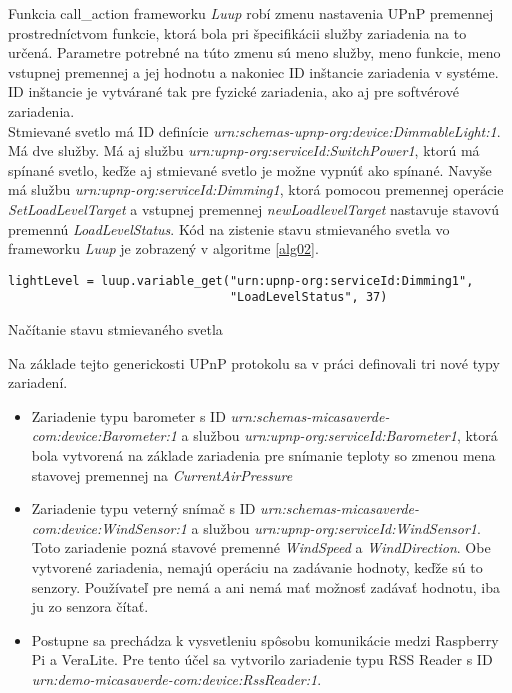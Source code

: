 Funkcia call\_action frameworku \textit{Luup} robí zmenu nastavenia UPnP premennej prostredníctvom funkcie, ktorá bola pri špecifikácii služby zariadenia na to určená. Parametre potrebné na túto zmenu sú meno služby, meno funkcie, meno vstupnej premennej a jej hodnotu a nakoniec ID inštancie zariadenia v systéme. ID inštancie je vytvárané tak pre fyzické zariadenia, ako aj pre softvérové zariadenia.\\
\indent Stmievané svetlo má ID definície \textit{urn:schemas-upnp-org:device:DimmableLight:1}. Má dve služby. Má aj službu \textit{urn:upnp-org:serviceId:SwitchPower1}, ktorú má spínané svetlo, keďže aj stmievané svetlo je možne vypnúť ako spínané. Navyše má službu \textit{urn:upnp-org:serviceId:Dimming1}, ktorá pomocou premennej operácie \textit{SetLoadLevelTarget} a vstupnej premennej \textit{newLoadlevelTarget} nastavuje stavovú premennú \textit{LoadLevelStatus}. Kód na zistenie stavu stmievaného svetla vo frameworku \textit{Luup} je zobrazený v algoritme \ref{alg02}.
\begin{algorithm}
%
\begin{lstlisting}
lightLevel = luup.variable_get("urn:upnp-org:serviceId:Dimming1", 
                               "LoadLevelStatus", 37)

\end{lstlisting}
 \caption{Načítanie stavu stmievaného svetla}
 \label{alg02}
\end{algorithm}
Na základe tejto generickosti UPnP protokolu sa v práci definovali tri nové typy zariadení.
\begin{itemize}
  \item Zariadenie typu barometer s ID  \textit{urn:schemas-micasaverde-com:device:Barometer:1} a službou \textit{urn:upnp-org:serviceId:Barometer1}, ktorá bola vytvorená na základe zariadenia pre snímanie teploty so zmenou mena stavovej premennej na \textit{CurrentAirPressure}
  \item Zariadenie typu veterný snímač s ID  \textit{urn:schemas-micasaverde-com:device:WindSensor:1} a službou \textit{urn:upnp-org:serviceId:WindSensor1}. Toto zariadenie pozná stavové premenné \textit{WindSpeed} a \textit{WindDirection}. Obe vytvorené zariadenia, nemajú operáciu na zadávanie hodnoty, keďže sú to senzory. Používateľ pre nemá a ani nemá mať možnosť zadávať hodnotu, iba ju zo senzora čítať.
  \item  Postupne sa prechádza k vysvetleniu spôsobu komunikácie medzi Raspberry Pi a VeraLite.  Pre tento účel sa vytvorilo  zariadenie typu RSS Reader s ID \textit{urn:demo-micasaverde-com:device:RssReader:1}.
\end{itemize} 
